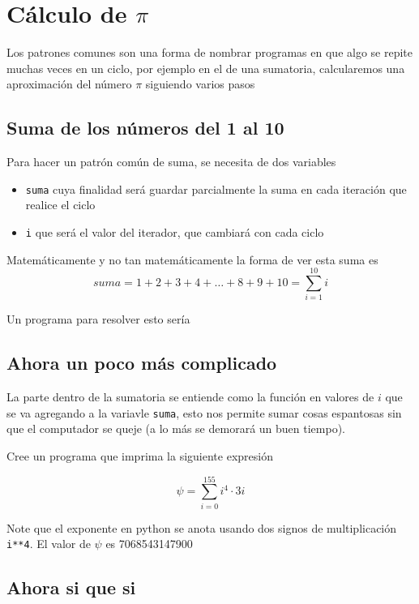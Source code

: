 \section*{Cálculo de $\pi$}

Los patrones comunes son una forma de nombrar programas en que algo se repite muchas veces en un ciclo, por ejemplo en el de una sumatoria, calcularemos una aproximación del número $\pi$ siguiendo varios pasos

\subsection*{Suma de los números del 1 al 10}

Para hacer un patrón común de suma, se necesita de dos variables
\begin{itemize}
    \item \texttt{suma} cuya finalidad será guardar parcialmente la suma en cada iteración que realice el ciclo
    \item \texttt{i} que será el valor del iterador, que cambiará con cada ciclo
\end{itemize}

Matemáticamente y no tan matemáticamente la forma de ver esta suma es 
$$ suma= 1+2+3+4+\ldots +8+9+10 = \sum_{i=1}^{10} i$$

Un programa para resolver esto sería

 

\subsection*{Ahora un poco más complicado}

La parte dentro de la sumatoria se entiende como la función en valores de $i$ que se va agregando a la variavle \texttt{suma}, esto nos permite sumar cosas espantosas sin que el computador se queje (a lo más se demorará un buen tiempo).

Cree un programa que imprima la siguiente expresión

$$\psi = \sum_{i=0}^{155} i^4 \cdot 3i $$

Note que el exponente en python se anota usando dos signos de multiplicación \texttt{i**4}. El valor de $\psi$ es 7068543147900

\subsection*{Ahora si que si}

